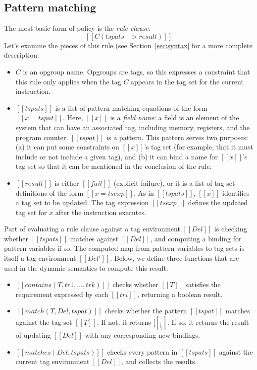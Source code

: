 \documentclass[12pt]{article}
\begin{document}
\subsection{Pattern matching}

The most basic form of policy is the {\em rule clause}.
\[
   [[C(tspats -> result)]]
\]
Let's examine the pieces of this rule (see Section~\ref{sec:syntax} for a more
complete description:
\begin{itemize}
\item $C$ is an opgroup name.  Opgroups are tags, so this expresses a constraint
  that this rule only applies when the tag $C$ appears in the tag set for the
  current instruction.
\item $[[tspats]]$ is a list of pattern matching equations of the form
  $[[x = tspat]]$.  Here, $[[x]]$ is a {\em field name}: a field is an element of
  the system that can have an associated tag, including memory, registers, and
  the program counter.  $[[tspat]]$ is a pattern.  This pattern serves two
  purposes: (a) it can put some constraints on $[[x]]$'s tag set (for example, that
  it must include or not include a given tag), and (b) it can bind a name for
  $[[x]]$'s tag set so that it can be mentioned in the conclusion of the rule.
\item $[[result]]$ is either $[[fail]]$ (explicit failure), or it is a list of
  tag set definitions of the form $[[x = tsexp]]$.  As in $[[tspats]]$, $[[x]]$
  identifies a tag set to be updated.  The tag expression $[[tsexp]]$ defines the
  updated tag set for $x$ after the instruction executes.
\end{itemize}

Part of evaluating a rule clause against a tag environment $[[Del]]$ is checking
whether $[[tspats]]$ matches against $[[Del]]$, and computing a binding for
pattern variables if so.  The computed map from pattern variables to tag sets is
itself a tag environment $[[Del']]$.  Below, we define three functions that are
used in the dynamic semantics to compute this result:

\begin{itemize}
\item $[[contains(T,tr1,...,trk)]]$ checks whether $[[T]]$ satisfies the
  requirement expressed by each $[[tri]]$, returning a boolean result.

\item $[[match (T , Del, tspat)]]$ checks whether the pattern $[[tspat]]$
  matches against the tag set $[[T]]$.  If not, it returns $[[_|_]]$.  If so, it
  returns the result of updating $[[Del]]$ with any corresponding new bindings.
\item $[[matches (Del, tspats)]]$ checks every pattern in $[[tspats]]$ against
  the current tag environment $[[Del]]$, and
  collects the results.
\end{itemize}
\end{document}
